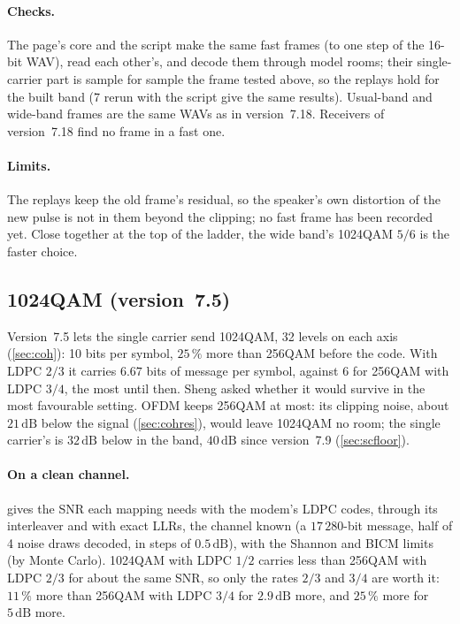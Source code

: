 \documentclass[11pt,a4paper]{article}
\newcommand{\dB}{\,\mathrm{dB}}
\theoremstyle{remark}
\begin{document}
\paragraph{Checks.}
The page's core and the script make the same fast frames (to one step of the 16-bit WAV), read each other's, and decode them through model rooms; their single-carrier part is sample for sample the frame tested above, so the replays hold for the built band (7 rerun with the script give the same results). Usual-band and wide-band frames are the same WAVs as in version~7.18. Receivers of version~7.18 find no frame in a fast one.

\paragraph{Limits.}
The replays keep the old frame's residual, so the speaker's own distortion of the new pulse is not in them beyond the clipping; no fast frame has been recorded yet. Close together at the top of the ladder, the wide band's 1024QAM $5/6$ is the faster choice.

\subsection{1024QAM (version~7.5)}
\label{sec:sc1024}
Version~7.5 lets the single carrier send 1024QAM, 32 levels on each axis (\cref{sec:coh}): 10 bits per symbol, $25\,\%$ more than 256QAM before the code. With LDPC $2/3$ it carries $6.67$ bits of message per symbol, against 6 for 256QAM with LDPC $3/4$, the most until then. Sheng asked whether it would survive in the most favourable setting. OFDM keeps 256QAM at most: its clipping noise, about $21\dB$ below the signal (\cref{sec:cohres}), would leave 1024QAM no room; the single carrier's is $32\dB$ below in the band, $40\dB$ since version~7.9 (\cref{sec:scfloor}).

\paragraph{On a clean channel.}
 gives the SNR each mapping needs with the modem's LDPC codes, through its interleaver and with exact LLRs, the channel known (a $17\,280$-bit message, half of 4 noise draws decoded, in steps of $0.5\dB$), with the Shannon and BICM limits (by Monte Carlo). 1024QAM with LDPC $1/2$ carries less than 256QAM with LDPC $2/3$ for about the same SNR, so only the rates $2/3$ and $3/4$ are worth it: $11\,\%$ more than 256QAM with LDPC $3/4$ for $2.9\dB$ more, and $25\,\%$ more for $5\dB$ more.
\end{document}
